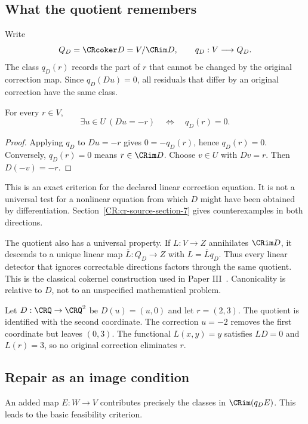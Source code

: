 \subsection{What the quotient remembers}
Write
\[
Q_D=\CRcoker D=V/\CRim D,\qquad q_D:V\longrightarrow Q_D.
\]
The class $q_D(r)$ records the part of $r$ that cannot be changed by the original correction map. Since $q_D(Du)=0$, all residuals that differ by an original correction have the same class.

\begin{CRtheorem}\label{CR:thm:correctable}
For every $r\in V$,
\[
\exists u\in U\ (Du=-r)\quad\Longleftrightarrow\quad q_D(r)=0.
\]
\end{CRtheorem}
\begin{proof}
Applying $q_D$ to $Du=-r$ gives $0=-q_D(r)$, hence $q_D(r)=0$. Conversely, $q_D(r)=0$ means $r\in\CRim D$. Choose $v\in U$ with $Dv=r$. Then $D(-v)=-r$.
\end{proof}

This is an exact criterion for the declared linear correction equation. It is not a universal test for a nonlinear equation from which $D$ might have been obtained by differentiation. Section~\ref{CR:cr-source-section-7} gives counterexamples in both directions.

The quotient also has a universal property. If $L:V\to Z$ annihilates $\CRim D$, it descends to a unique linear map $\overline L:Q_D\to Z$ with $L=\overline Lq_D$. Thus every linear detector that ignores correctable directions factors through the same quotient. This is the classical cokernel construction used in Paper III~\cite{CR:paperiii}. Canonicality is relative to $D$, not to an unspecified mathematical problem.

\begin{CRexample}\label{CR:ex:plane}
Let $D:\CRQ\to\CRQ^2$ be $D(u)=(u,0)$ and let $r=(2,3)$. The quotient is identified with the second coordinate. The correction $u=-2$ removes the first coordinate but leaves $(0,3)$. The functional $L(x,y)=y$ satisfies $LD=0$ and $L(r)=3$, so no original correction eliminates $r$.
\end{CRexample}

\subsection{Repair as an image condition}
An added map $E:W\to V$ contributes precisely the classes in $\CRim(q_DE)$. This leads to the basic feasibility criterion.

